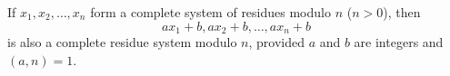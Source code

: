If $x_1, x_2, \ldots, x_n$ form a complete system of residues modulo $n$ ($n > 0$), then
$$a x_1 + b, a x_2 + b, \ldots, a x_n + b$$
is also a complete residue system modulo $n$, provided $a$ and $b$ are integers and $(a, n) = 1$.
